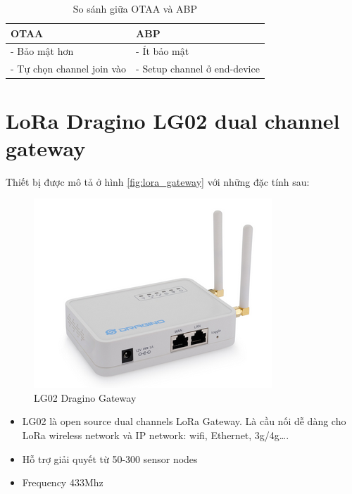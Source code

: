 \begin{table}[H]
    \centering
    \caption{So sánh giữa OTAA và ABP} 
    \label{tab.network.otaa}
    \begin{tabular}{| m{6cm} | m{6cm} |}
        \hline
        OTAA & ABP \\

        \hline
        -	Bảo mật hơn & - Ít bảo mật \\
        -	Tự chọn channel join vào & - Setup channel ở end-device \\
        
        \hline
    \end{tabular}
\end{table}

\section{LoRa Dragino LG02 dual channel gateway}
Thiết bị được mô tả ở hình \ref{fig:lora_gateway} với những đặc tính sau:
\begin{figure}[H]
    \includegraphics[width=\textwidth]{images/Quanh/lora_gateway.png}
    \caption{LG02 Dragino Gateway}
    \label{fig:lorawan_gateway}
\end{figure}

\begin{itemize}
    \item LG02 là open source dual channels LoRa Gateway. Là cầu nối dễ dàng cho LoRa wireless network và IP network: wifi, Ethernet, 3g/4g\dots .
    \item Hỗ trợ giải quyết từ 50-300 sensor nodes
    \item Frequency 433Mhz
\end{itemize}


